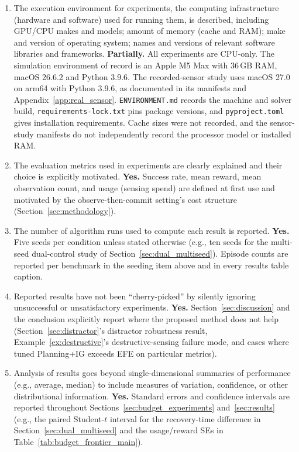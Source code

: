 \documentclass[manuscript, screen, review]{jair}
\begin{document}
\begin{enumerate}
Sensor-study split/quantizer, mixture-check and bootstrap seeds are $20261001$, $20261002$ and $20261003$, with a derived later-batch stream. Its bootstrap draws are conditional case resamples, not independent model fits. Exact reproduction uses the recorded environment or archived trajectories.
\item The execution environment for experiments, the computing infrastructure (hardware and software) used for running them, is described, including GPU/CPU makes and models; amount of memory (cache and RAM); make and version of operating system; names and versions of relevant software libraries and frameworks. \textbf{Partially.} All experiments are CPU-only. The simulation environment of record is an Apple M5 Max with $36$\,GB RAM, macOS 26.6.2 and Python 3.9.6. The recorded-sensor study uses macOS 27.0 on arm64 with Python 3.9.6, as documented in its manifests and Appendix~\ref{app:real_sensor}. \texttt{ENVIRONMENT.md} records the machine and solver build, \texttt{requirements-lock.txt} pins package versions, and \texttt{pyproject.toml} gives installation requirements. Cache sizes were not recorded, and the sensor-study manifests do not independently record the processor model or installed RAM.
\item The evaluation metrics used in experiments are clearly explained and their choice is explicitly motivated. \textbf{Yes.} Success rate, mean reward, mean observation count, and usage (sensing spend) are defined at first use and motivated by the observe-then-commit setting's cost structure (Section~\ref{sec:methodology}).
\item The number of algorithm runs used to compute each result is reported. \textbf{Yes.} Five seeds per condition unless stated otherwise (e.g., ten seeds for the multi-seed dual-control study of Section~\ref{sec:dual_multiseed}). Episode counts are reported per benchmark in the seeding item above and in every results table caption.
\item Reported results have not been ``cherry-picked'' by silently ignoring unsuccessful or unsatisfactory experiments. \textbf{Yes.} Section~\ref{sec:discussion} and the conclusion explicitly report where the proposed method does not help (Section~\ref{sec:distractor}'s distractor robustness result, Example~\ref{ex:destructive}'s destructive-sensing failure mode, and cases where tuned Planning+IG exceeds EFE on particular metrics).
\item Analysis of results goes beyond single-dimensional summaries of performance (e.g., average, median) to include measures of variation, confidence, or other distributional information. \textbf{Yes.} Standard errors and confidence intervals are reported throughout Sections~\ref{sec:budget_experiments} and~\ref{sec:results} (e.g., the paired Student-$t$ interval for the recovery-time difference in Section~\ref{sec:dual_multiseed} and the usage/reward SEs in Table~\ref{tab:budget_frontier_main}).

\end{enumerate}
\end{document}
